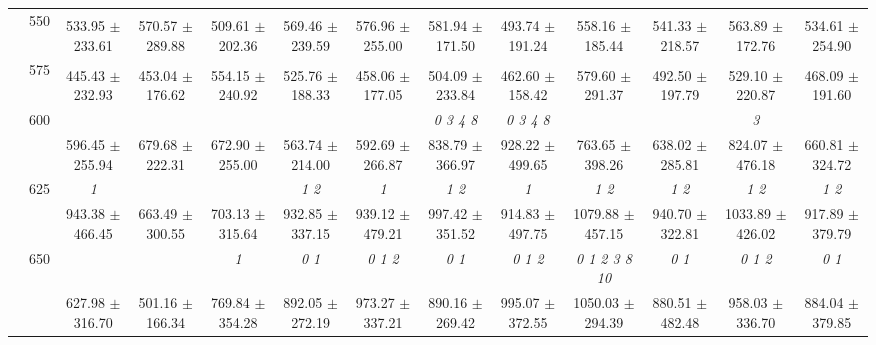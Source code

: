 \begin{table}[h]
{\begin{tabular}{
        ccccccccccccc}
 & \multirow{2}{*}{550}& & & & & & & & & & &  \\ 
 & & 533.95 $\pm$ 233.61& 570.57 $\pm$ 289.88& 509.61 $\pm$ 202.36& 569.46 $\pm$ 239.59& 576.96 $\pm$ 255.00& 581.94 $\pm$ 171.50& 493.74 $\pm$ 191.24& 558.16 $\pm$ 185.44& 541.33 $\pm$ 218.57& 563.89 $\pm$ 172.76& 534.61 $\pm$ 254.90 \\ 
 & \multirow{2}{*}{575}& \cellcolor[HTML]{EFEFEF} & \cellcolor[HTML]{EFEFEF} & \cellcolor[HTML]{EFEFEF} & \cellcolor[HTML]{EFEFEF} & \cellcolor[HTML]{EFEFEF} & \cellcolor[HTML]{EFEFEF} & \cellcolor[HTML]{EFEFEF} & \cellcolor[HTML]{EFEFEF} & \cellcolor[HTML]{EFEFEF} & \cellcolor[HTML]{EFEFEF} & \cellcolor[HTML]{EFEFEF}  \\ 
 & & \cellcolor[HTML]{EFEFEF} 445.43 $\pm$ 232.93& \cellcolor[HTML]{EFEFEF} 453.04 $\pm$ 176.62& \cellcolor[HTML]{EFEFEF} 554.15 $\pm$ 240.92& \cellcolor[HTML]{EFEFEF} 525.76 $\pm$ 188.33& \cellcolor[HTML]{EFEFEF} 458.06 $\pm$ 177.05& \cellcolor[HTML]{EFEFEF} 504.09 $\pm$ 233.84& \cellcolor[HTML]{EFEFEF} 462.60 $\pm$ 158.42& \cellcolor[HTML]{EFEFEF} 579.60 $\pm$ 291.37& \cellcolor[HTML]{EFEFEF} 492.50 $\pm$ 197.79& \cellcolor[HTML]{EFEFEF} 529.10 $\pm$ 220.87& \cellcolor[HTML]{EFEFEF} 468.09 $\pm$ 191.60 \\ 
 & \multirow{2}{*}{600}& & & & & & \textit{ 0 3 4 8 }& \textit{ 0 3 4 8 }& & & \textit{ 3 }&  \\ 
 & & 596.45 $\pm$ 255.94& 679.68 $\pm$ 222.31& 672.90 $\pm$ 255.00& 563.74 $\pm$ 214.00& 592.69 $\pm$ 266.87& 838.79 $\pm$ 366.97& 928.22 $\pm$ 499.65& 763.65 $\pm$ 398.26& 638.02 $\pm$ 285.81& 824.07 $\pm$ 476.18& 660.81 $\pm$ 324.72 \\ 
 & \multirow{2}{*}{625}& \cellcolor[HTML]{EFEFEF} \textit{ 1 }& \cellcolor[HTML]{EFEFEF} & \cellcolor[HTML]{EFEFEF} & \cellcolor[HTML]{EFEFEF} \textit{ 1 2 }& \cellcolor[HTML]{EFEFEF} \textit{ 1 }& \cellcolor[HTML]{EFEFEF} \textit{ 1 2 }& \cellcolor[HTML]{EFEFEF} \textit{ 1 }& \cellcolor[HTML]{EFEFEF} \textit{ 1 2 }& \cellcolor[HTML]{EFEFEF} \textit{ 1 2 }& \cellcolor[HTML]{EFEFEF} \textit{ 1 2 }& \cellcolor[HTML]{EFEFEF} \textit{ 1 2 } \\ 
 & & \cellcolor[HTML]{EFEFEF} 943.38 $\pm$ 466.45& \cellcolor[HTML]{EFEFEF} 663.49 $\pm$ 300.55& \cellcolor[HTML]{EFEFEF} 703.13 $\pm$ 315.64& \cellcolor[HTML]{EFEFEF} 932.85 $\pm$ 337.15& \cellcolor[HTML]{EFEFEF} 939.12 $\pm$ 479.21& \cellcolor[HTML]{EFEFEF} 997.42 $\pm$ 351.52& \cellcolor[HTML]{EFEFEF} 914.83 $\pm$ 497.75& \cellcolor[HTML]{EFEFEF} 1079.88 $\pm$ 457.15& \cellcolor[HTML]{EFEFEF} 940.70 $\pm$ 322.81& \cellcolor[HTML]{EFEFEF} 1033.89 $\pm$ 426.02& \cellcolor[HTML]{EFEFEF} 917.89 $\pm$ 379.79 \\ 
 & \multirow{2}{*}{650}& & & \textit{ 1 }& \textit{ 0 1 }& \textit{ 0 1 2 }& \textit{ 0 1 }& \textit{ 0 1 2 }& \textit{  0  1  2  3  8 10 }& \textit{ 0 1 }& \textit{ 0 1 2 }& \textit{ 0 1 } \\ 
 & & 627.98 $\pm$ 316.70& 501.16 $\pm$ 166.34& 769.84 $\pm$ 354.28& 892.05 $\pm$ 272.19& 973.27 $\pm$ 337.21& 890.16 $\pm$ 269.42& 995.07 $\pm$ 372.55& 1050.03 $\pm$ 294.39& 880.51 $\pm$ 482.48& 958.03 $\pm$ 336.70& 884.04 $\pm$ 379.85 \\ \midrule 


\end{tabular}}
\end{table}
